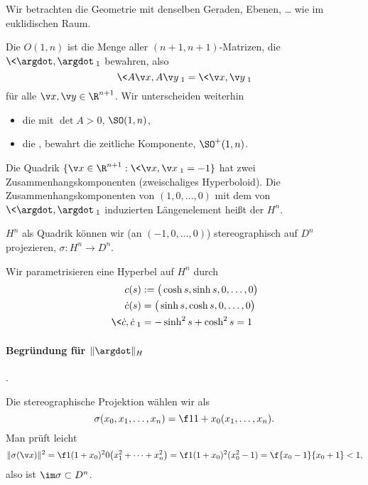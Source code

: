 Wir betrachten die Geometrie mit denselben Geraden, Ebenen, … wie im euklidischen Raum.

\begin{df}
	Die  $O(1, n)$ ist die Menge aller $(n+1, n+1)$-Matrizen, die $\<\argdot, \argdot\>_1$ bewahren, also
	\[
		\< A\v x, A\v y\>_1 = \< \v x, \v y \>_1
	\]
	für alle $\v x, \v y \in \R^{n+1}$.
	Wir unterscheiden weiterhin
	\begin{itemize}
		\item
			die  mit $\det A > 0$, $\SO(1, n)$,
		\item
			die , bewahrt die zeitliche Komponente, $\SO^+(1, n)$.
	\end{itemize}
\end{df}

\begin{df}
	Die Quadrik $\{\v x \in \R^{n+1} : \<\v x, \v x\>_1 = -1 \}$ hat zwei Zusammenhangskomponenten (zweischaliges Hyperboloid).
	Die Zusammenhangskomponenten von $(1, 0, \dotsc, 0)$ mit dem von $\<\argdot, \argdot\>_1$ induzierten Längenelement heißt der  $H^n$.
\end{df}

$H^n$ als Quadrik können wir (an $(-1, 0, \dotsc, 0)$) stereographisch auf $D^n$ projezieren, $\sigma: H^n \to D^n$.

Wir parametrisieren eine Hyperbel auf $H^n$ durch
\begin{align*}
	c(s) &:= \big( \cosh s, \sinh s, 0, \dotsc, 0 \big) \\
	\dot c (s) &= \big( \sinh s, \cosh s, 0, \dotsc, 0 \big) \\
	\<\dot c, \dot c\>_1 &= - \sinh^2 s + \cosh^2 s = 1
\end{align*}

\paragraph{Begründung für $\|\argdot\|_H$}.

Die stereographische Projektion wählen wir als
\[
	\sigma(x_0, x_1, \dotsc, x_n) = \f 1{1+ x_0} (x_1, \dotsc, x_n).
\]
Man prüft leicht
\[
	\|\sigma(\v x)\|^2
	= \f 1{(1+x_0)^2}0\big( x_1 ^2 + \dotsb + x_n^2 \big)
	= \f 1{(1+x_0)^2} (x_0^2 - 1) = \f {x_0 - 1}{x_0 + 1} < 1,
\]
also ist $\im \sigma \subset D^n$.

